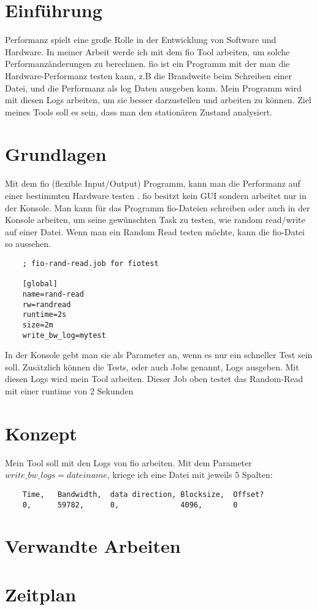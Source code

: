 \documentclass{article}
\begin{document}
\tableofcontents{}


\newpage
\section{Einführung}
Performanz spielt eine große Rolle in der Entwicklung von Software und Hardware.
In meiner Arbeit werde ich mit dem fio Tool arbeiten, um solche Performanzänderungen zu berechnen.
fio ist ein Programm mit der man die Hardware-Performanz testen kann, z.B die Brandweite beim Schreiben einer Datei, und die Performanz als log Daten ausgeben kann.
Mein Programm wird mit diesen Logs arbeiten, um sie besser darzustellen und arbeiten zu können. Ziel meines Tools soll es sein, dass man den stationären Zustand analysiert.


\section{Grundlagen}
Mit dem fio (flexible Input/Output) Programm, kann man die Performanz auf einer bestimmten Hardware testen .
fio besitzt kein GUI sondern arbeitet nur in der Konsole. Man kann für das Programm fio-Dateien schreiben oder auch in der Konsole arbeiten, um seine gewünschten Task zu testen,
wie random read/write auf einer Datei.
Wenn man ein Random Read testen möchte, kann die fio-Datei so aussehen.

\begin{lstlisting}
    ; fio-rand-read.job for fiotest

    [global]
    name=rand-read
    rw=randread
    runtime=2s
    size=2m
    write_bw_log=mytest

\end{lstlisting}
In der Konsole gebt man sie als Parameter an, wenn es nur ein schneller Test sein soll. Zusätzlich können die Tests, 
oder auch Jobs genannt, Logs ausgeben. Mit diesen Logs wird mein Tool arbeiten. Dieser Job oben testet das Random-Read mit einer
runtime von 2 Sekunden 

\section{Konzept}
Mein Tool soll mit den Logs von fio arbeiten. \newline
Mit dem Parameter $write\_bw\_logs=dateiname$, kriege ich eine Datei mit jeweils 5 Spalten:
\begin{lstlisting}
    Time,	Bandwidth,	data direction, Blocksize,	Offset?
    0, 	    59782, 		0,		        4096,		0
\end{lstlisting}

\section{Verwandte Arbeiten}
\section{Zeitplan}
\end{document}
